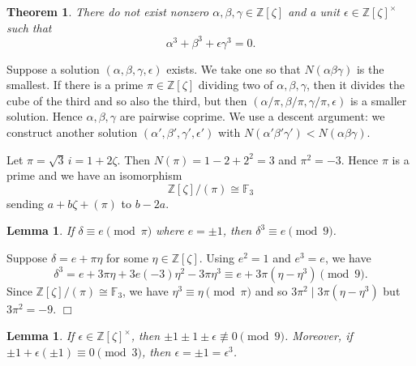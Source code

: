 \documentclass{article}
\def\Z{{\mathbb Z}}
\def\F{{\mathbb F}}
\def\Z{{\mathbb Z}}
\def\F{{\mathbb F}}
\newtheorem{theorem}[subsection]{Theorem}
\newtheorem{lemma}[subsection]{Lemma}
\newenvironment{proof}{\noindent {\bf Proof:}}{$\Box$ \vspace{2 ex}}
\begin{document}
\begin{theorem}
    There do not exist nonzero $\alpha,\beta,\gamma\in\Z[\zeta]$ and a unit $\epsilon\in\Z[\zeta]^\times$ such that $$\alpha^3 + \beta^3 + \epsilon\gamma^3 = 0.$$
\end{theorem}

Suppose a solution $(\alpha,\beta,\gamma,\epsilon)$ exists. We take one so that $N(\alpha\beta\gamma)$ is the smallest. If there is a prime $\pi\in\Z[\zeta]$ dividing two of $\alpha,\beta,\gamma$, then it divides the cube of the third and so also the third,  but then $(\alpha/\pi,\beta/\pi,\gamma/\pi,\epsilon)$ is a smaller solution. Hence $\alpha,\beta,\gamma$ are pairwise coprime. We use a descent argument: we construct another solution $(\alpha',\beta',\gamma',\epsilon')$ with $N(\alpha'\beta'\gamma')<N(\alpha\beta\gamma)$.

Let $\pi = \sqrt{3}\,i = 1 + 2\zeta$. Then $N(\pi) = 1-2+2^2 =3$ and $\pi^2 = -3$. Hence $\pi$ is a prime and we have an isomorphism $$\Z[\zeta]/(\pi)\cong \F_3$$
sending $a + b\zeta + (\pi)$ to $b - 2a$.

\begin{lemma}
    If $\delta\equiv e\pmod{\pi}$ where $e = \pm1$, then $\delta^3\equiv e \pmod{9}$.
\end{lemma}

\begin{proof}
    Suppose $\delta = e + \pi\eta$ for some $\eta\in\Z[\zeta]$. Using $e^2 = 1$ and $e^3 = e$, we have
    $$\delta^3 = e + 3\pi\eta + 3e(-3)\eta^2 - 3\pi\eta^3 \equiv e + 3\pi(\eta-\eta^3) \pmod{9}.$$
    Since $\Z[\zeta]/(\pi)\cong \F_3$, we have $\eta^3\equiv \eta\pmod{\pi}$ and so $3\pi^2\mid 3\pi(\eta-\eta^3)$ but $3\pi^2 = -9$.
\end{proof}

\begin{lemma}
    If $\epsilon\in\Z[\zeta]^\times$, then $\pm1\pm1\pm\epsilon\not\equiv 0\pmod{9}$. Moreover, if $\pm1 + \epsilon(\pm1)\equiv 0\pmod{3}$, then  $\epsilon = \pm1 = \epsilon^3$.
\end{lemma}
\end{document}
